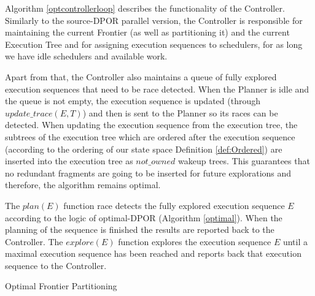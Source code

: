 Algorithm \ref{optcontrollerloop} describes the functionality of the Controller. Similarly to the source-DPOR parallel version,
the Controller is responsible for maintaining the current Frontier (as well as partitioning it) and the current Execution Tree
and for assigning execution sequences to schedulers, for as long we have idle schedulers and available work.

Apart from that, the Controller also maintains a queue of fully explored execution sequences that need to be race detected.
When the Planner is idle and the queue is not empty, the execution sequence is updated (through $update\_trace(E,T)$)
and then is sent to the Planner so its races can be detected. When updating the execution sequence from the execution tree,
the subtrees of the execution tree which are ordered after the execution sequence (according to the ordering of our state
space Definition \ref{def:Ordered}) are inserted into the execution tree as $not\_owned$ wakeup trees. This guarantees
that no redundant fragments are going to be inserted for future explorations and therefore, the algorithm remains optimal. 

The $plan(E)$ function race detects the fully explored execution sequence $E$ according to the logic of optimal-DPOR 
(Algorithm \ref{optimal}). When the planning of the sequence is finished the results are reported back to the Controller.
The $explore(E)$ function explores the execution sequence $E$ until a maximal execution sequence
has been reached and reports back that execution sequence to the Controller.


\begin{algorithm}
    \caption{Optimal Frontier Partitioning}
    \label{optpartition}

\end{algorithm}

